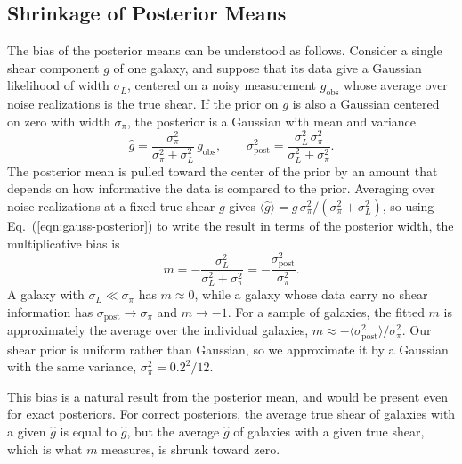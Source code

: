 \subsection{Shrinkage of Posterior Means}
\label{ssec:shrinkage}

The bias of the posterior means can be understood as follows. Consider a single shear component $g$ of one galaxy, and suppose that its data give a Gaussian likelihood of width $\sigma_L$, centered on a noisy measurement $g_\mathrm{obs}$ whose average over noise realizations is the true shear. If the prior on $g$ is also a Gaussian centered on zero with width $\sigma_\pi$, the posterior is a Gaussian with mean and variance
\begin{equation}
\label{eqn:gauss-posterior}
    \hat{g} = \frac{\sigma_\pi^2}{\sigma_\pi^2 + \sigma_L^2}\, g_\mathrm{obs}, \qquad
    \sigma_\mathrm{post}^2 = \frac{\sigma_L^2\, \sigma_\pi^2}{\sigma_L^2 + \sigma_\pi^2}.
\end{equation}
The posterior mean is pulled toward the center of the prior by an amount that depends on how informative the data is compared to the prior. Averaging over noise realizations at a fixed true shear $g$ gives $\langle \hat{g} \rangle = g\,\sigma_\pi^2/(\sigma_\pi^2 + \sigma_L^2)$, so using Eq.~(\ref{eqn:gauss-posterior}) to write the result in terms of the posterior width, the multiplicative bias is
\begin{equation}
\label{eqn:shrinkage}
    m = -\frac{\sigma_L^2}{\sigma_L^2 + \sigma_\pi^2} = -\frac{\sigma_\mathrm{post}^2}{\sigma_\pi^2}.
\end{equation}
A galaxy with $\sigma_L \ll \sigma_\pi$ has $m \approx 0$, while a galaxy whose data carry no shear information has $\sigma_\mathrm{post} \to \sigma_\pi$ and $m \to -1$. For a sample of galaxies, the fitted $m$ is approximately the average over the individual galaxies, $m \approx -\langle \sigma_\mathrm{post}^2 \rangle / \sigma_\pi^2$. Our shear prior is uniform rather than Gaussian, so we approximate it by a Gaussian with the same variance, $\sigma_\pi^2 = 0.2^2/12$.

This bias is a natural result from the posterior mean, and would be present even for exact posteriors. For correct posteriors, the average true shear of galaxies with a given $\hat{g}$ is equal to $\hat{g}$, but the average $\hat{g}$ of galaxies with a given true shear, which is what $m$ measures, is shrunk toward zero.

